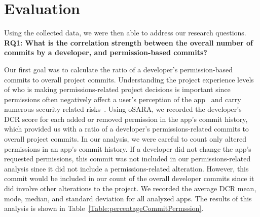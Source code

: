 \documentclass{sig-alternate-05-2015}
\newcommand{\todo}[1]{\textcolor{cyan}{\textbf{[#1]}}}
\begin{document}



\section{Evaluation}
\label{sec: evaluation}





Using the collected data, we were then able to address our research questions. \\

\noindent
\textbf{RQ1: What is the correlation strength between the overall number of commits by a developer, and permission-based commits?} %


Our first goal was to calculate the ratio of a developer's permission-based commits to overall project commits. Understanding the project experience levels of who is making permissions-related project decisions is important since permissions often negatively affect a user's perception of the app~\cite{Egelman12choicearchitecture} and carry numerous security related risks~\cite{Felt:2011:APD:2046707.2046779, 5482589}. Using oSARA, we recorded the developer's DCR score for each added or removed permission in the app's commit history, which provided us with a ratio of a developer's permissions-related commits to overall project commits. In our analysis, we were careful to count only altered permissions in an app's commit history. If a developer did not change the app's requested permissions, this commit was not included in our permissions-related analysis since it did not include a permissions-related alteration. However, this commit would be included in our count of the overall developer commits since it did involve other alterations to the project. We recorded the average DCR mean, mode, median, and standard deviation for all analyzed apps. The results of this analysis is shown in Table~\ref{Table:percentageCommitPermssion}.
\end{document}
